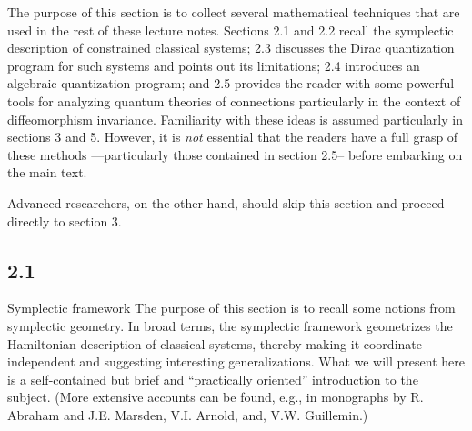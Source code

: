 The purpose of this section is to collect several mathematical techniques
that are used in the rest of these lecture notes. Sections 2.1 and 2.2
recall the symplectic description of constrained classical systems;
2.3 discusses the Dirac quantization program for such systems and points
out its limitations; 2.4 introduces an algebraic quantization program; and
2.5 provides the reader with some powerful tools for analyzing quantum
theories of connections particularly in the context of diffeomorphism
invariance. Familiarity with these ideas is assumed particularly in sections
3 and 5. However, it is {\it not} essential that the readers have a full
grasp of these methods ---particularly those contained in section 2.5--
before embarking on the main text.

Advanced researchers, on the other hand, should skip this section and
proceed directly to section 3.

\subsection{2.1}{Symplectic framework}
%
The purpose of this section is to recall some notions from symplectic
geometry. In broad terms, the symplectic framework geometrizes the
Hamiltonian description of classical systems, thereby making it
coordinate-independent and suggesting interesting generalizations. What we
will present here is a self-contained but brief and ``practically oriented''
introduction to the subject. (More extensive accounts can be found, e.g., in
monographs by R. Abraham and J.E. Marsden, V.I. Arnold, and, V.W. Guillemin.)

